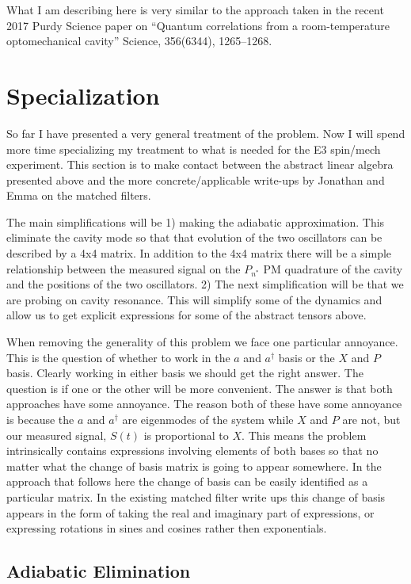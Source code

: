 \documentclass[12pt]{article}
\begin{document}
What I am describing here is very similar to the approach taken in the recent 2017 Purdy Science paper on ``Quantum correlations from a room-temperature optomechanical cavity''  Science, 356(6344), 1265–1268.

\section{Specialization}

So far I have presented a very general treatment of the problem. Now I will spend more time specializing my treatment to what is needed for the E3 spin/mech experiment. This section is to make contact between the abstract linear algebra presented above and the more concrete/applicable write-ups by Jonathan and Emma on the matched filters.

The main simplifications will be 1) making the adiabatic approximation. This eliminate the cavity mode so that that evolution of the two oscillators can be described by a 4x4 matrix. In addition to the 4x4 matrix there will be a simple relationship between the measured signal on the $P_{n^*}$ PM quadrature of the cavity and the positions of the two oscillators. 2) The next simplification will be that we are probing on cavity resonance. This will simplify some of the dynamics and allow us to get explicit expressions for some of the abstract tensors above.

When removing the generality of this problem we face one particular annoyance. This is the question of whether to work in the $a$ and $a^{\dag}$ basis or the $X$ and $P$ basis. Clearly working in either basis we should get the right answer. The question is if one or the other will be more convenient. The answer is that both approaches have some annoyance. The reason both of these have some annoyance is because the $a$ and $a^{\dag}$ are eigenmodes of the system while $X$ and $P$ are not, but our measured signal, $S(t)$ is proportional to $X$. This means the problem intrinsically contains expressions involving elements of both bases so that no matter what the change of basis matrix is going to appear somewhere. In the approach that follows here the change of basis can be easily identified as a particular matrix. In the existing matched filter write ups this change of basis appears in the form of taking the real and imaginary part of expressions, or expressing rotations in sines and cosines rather then exponentials.

\subsection{Adiabatic Elimination}
\end{document}
